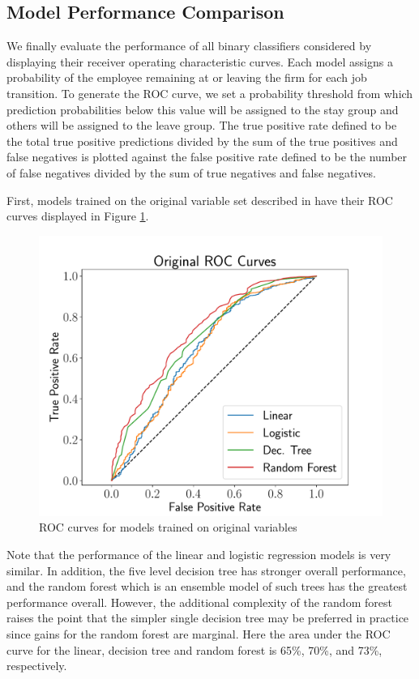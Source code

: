 \documentclass[10pt]{article}
\begin{document}
\subsection{Model Performance Comparison}
\hspace{\parindent}
We finally evaluate the performance of all binary classifiers considered by displaying their 
receiver operating characteristic curves.  Each model assigns a probability of the employee 
remaining at or leaving the firm for each job transition.  To generate the ROC curve, 
we set a probability threshold from which prediction probabilities below this value 
will be assigned to the stay group and others will be assigned to the leave group.  
The true positive rate defined to be the total true positive predictions divided 
by the sum of the true positives and false negatives is plotted against the 
false positive rate defined to be the number of false negatives divided by the 
sum of true negatives and false negatives.

First, models trained on the original variable set described in \cite{Smart2016} 
have their ROC curves displayed in Figure \ref{fig:orgroc}.
%
\begin{figure}[thb]
    \centering
	\includegraphics[width=1.0\linewidth]{oriROC.pdf}
	\caption{ROC curves for models trained on original variables}
	\label{fig:orgroc}
\end{figure}
%
Note that the performance of the linear and logistic regression models is very similar. 
In addition, the five level decision tree has stronger overall performance, and the 
random forest which is an ensemble model of such trees has the greatest performance overall.
However, the additional complexity of the random forest raises the point that the simpler 
single decision tree may be preferred in practice since gains for the random forest 
are marginal.  Here the area under the ROC curve for the linear, decision tree and random forest 
is 65\%, 70\%, and 73\%, respectively.  
\end{document}
